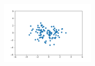 \documentclass[a4paper]{article}
\theoremstyle{definition}
\newenvironment{soln}{
    \leavevmode\color{blue}\ignorespaces
}{}
\begin{document}
\begin{enumerate}
  	\begin{soln}

	   \begin{figure}[H]
	        \centering
	        \includegraphics[width=0.4\textwidth]{3.png}
	        \captionsetup{labelformat=empty}
	        \caption{}
	        \label{fig:my_label}
	   \end{figure}
	\end{soln}
\end{enumerate}





\end{document}
